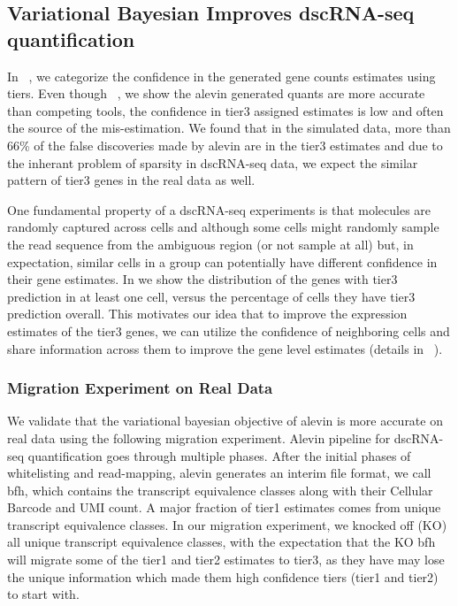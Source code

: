 \subsection{Variational Bayesian Improves dscRNA-seq quantification}
In ~, we categorize the confidence in the generated gene counts estimates using tiers. 
Even though ~, we show the alevin generated quants are more accurate
than competing tools, the confidence in tier3 assigned estimates is low and often the source of 
the mis-estimation. We found that in the simulated data, more than 66\% of the false discoveries made 
by alevin are in the tier3 estimates and due to the inherant problem of sparsity in dscRNA-seq data,
we expect the similar pattern of tier3 genes in the real data as well. 

One fundamental property of a dscRNA-seq experiments is that molecules are randomly captured across cells 
and although some cells might randomly sample the read sequence from the ambiguous region 
(or not sample at all) but, in expectation, similar cells in a group can potentially have different 
confidence in their gene estimates. In  we show the distribution of the genes with tier3 
prediction in at least one cell, versus the percentage of cells they have tier3 prediction overall.
This motivates our idea that to improve the expression estimates of the tier3 genes, we can utilize the
confidence of neighboring cells and share information across them to improve the gene level estimates 
(details in ~).

\subsubsection{Migration Experiment on Real Data}
We validate that the variational bayesian objective of alevin is more accurate on real data using the
following migration experiment. Alevin pipeline for dscRNA-seq quantification goes through multiple 
phases. After the initial phases of whitelisting and read-mapping, alevin generates an interim 
file format, we call bfh, which contains the transcript equivalence classes along with their Cellular
Barcode and UMI count. A major fraction of tier1 estimates comes from unique transcript equivalence
classes. In our migration experiment, we knocked off (KO) all unique transcript equivalence classes, with
the expectation that the KO bfh will migrate some of the tier1 and tier2 estimates to tier3, as they have
may lose the unique information which made them high confidence tiers (tier1 and tier2) to start with. 

